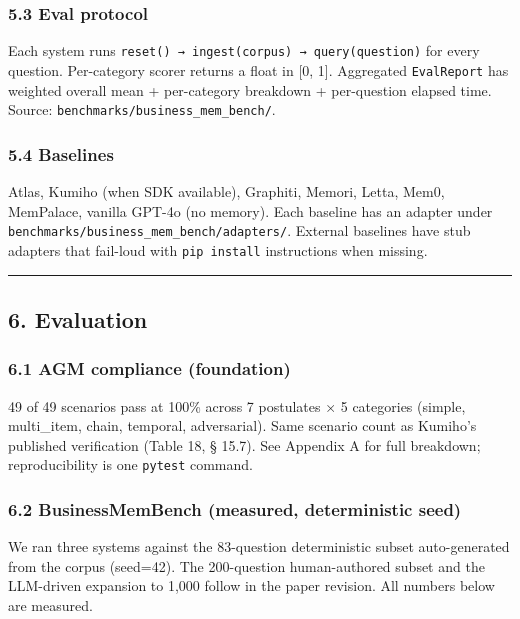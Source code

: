 \documentclass[
  11pt,
]{article}
\begin{document}
\subsubsection{5.3 Eval protocol}\label{eval-protocol}

Each system runs \texttt{reset()\ →\ ingest(corpus)\ →\ query(question)}
for every question. Per-category scorer returns a float in {[}0, 1{]}.
Aggregated \texttt{EvalReport} has weighted overall mean + per-category
breakdown + per-question elapsed time. Source:
\texttt{benchmarks/business\_mem\_bench/}.

\subsubsection{5.4 Baselines}\label{baselines}

Atlas, Kumiho (when SDK available), Graphiti, Memori, Letta, Mem0,
MemPalace, vanilla GPT-4o (no memory). Each baseline has an adapter
under \texttt{benchmarks/business\_mem\_bench/adapters/}. External
baselines have stub adapters that fail-loud with \texttt{pip\ install}
instructions when missing.

\begin{center}\rule{0.5\linewidth}{0.5pt}\end{center}

\subsection{6. Evaluation}\label{evaluation}

\subsubsection{6.1 AGM compliance
(foundation)}\label{agm-compliance-foundation}

49 of 49 scenarios pass at 100\% across 7 postulates × 5 categories
(simple, multi\_item, chain, temporal, adversarial). Same scenario count
as Kumiho's published verification (Table 18, § 15.7). See Appendix A
for full breakdown; reproducibility is one \texttt{pytest} command.

\subsubsection{6.2 BusinessMemBench (measured, deterministic
seed)}\label{businessmembench-measured-deterministic-seed}

We ran three systems against the 83-question deterministic subset
auto-generated from the corpus (seed=42). The 200-question
human-authored subset and the LLM-driven expansion to 1,000 follow in
the paper revision. All numbers below are measured.
\end{document}
